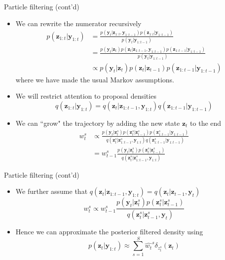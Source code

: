 \documentclass[10pt,mathserif]{beamer}
\begin{document}
\begin{frame}{Particle filtering (cont'd)}
\begin{itemize}
    \item We can rewrite the numerator recursively
    \begin{equation*} 
        \begin{split}
            p(\bm{z}_{1:t}|\bm{y}_{1:t})
            & = \frac{p(\bm{y}_t|\bm{z}_{1:t}, \bm{y}_{1:t-1})p(\bm{z}_{1:t}|\bm{y}_{1:t-1})}{p(\bm{y}_t|\bm{y}_{1:t-1})}\\
            & = \frac{p(\bm{y}_t|\bm{z}_t)p(\bm{z}_t|\bm{z}_{1:t-1}, \bm{y}_{1:t-1})p(\bm{z}_{1:t-1}|\bm{y}_{1:t-1})}{p(\bm{y}_t|\bm{y}_{1:t-1})} \\
            & \propto p(\bm{y}_t|\bm{z}_t)p(\bm{z}_t|\bm{z}_{t-1})p(\bm{z}_{1:t-1}|\bm{y}_{1:t-1})
        \end{split}
    \end{equation*} 
    where we have made the usual Markov assumptions. 
    \item We will restrict attention to proposal densities
    \begin{equation*} 
        q(\bm{z}_{1:t}|\bm{y}_{1:t}) = q(\bm{z}_t|\bm{z}_{1:t-1}, \bm{y}_{1:t})q(\bm{z}_{1:t-1}|\bm{y}_{1:t-1})
    \end{equation*} 
    \item We can ``grow" the trajectory by adding the new state $\bm{z}_t$ to the end
    \begin{equation*} 
        \begin{split}
            w_t^s 
            & \propto \frac{p(\bm{y}_t|\bm{z}_t^s )p(\bm{z}_t^s |\bm{z}_{t-1}^s)p(\bm{z}_{1:t-1}^s|\bm{y}_{1:t-1})}{q(\bm{z}_t^s|\bm{z}_{1:t-1}^s, \bm{y}_{1:t})q(\bm{z}_{1:t-1}^s|\bm{y}_{1:t-1}) }\\
            & = w_{t-1}^s\frac{p(\bm{y}_t|\bm{z}_t^s)p(\bm{z}_t^s |\bm{z}_{t-1}^s)}{q(\bm{z}_t^s |\bm{z}_{1:t-1}^s, \bm{y}_{1:t})}
        \end{split}    
    \end{equation*} 
\end{itemize}    
\end{frame}

\begin{frame}{Particle filtering (cont'd)}
\begin{itemize}
    \item We further assume that $q(\bm{z}_t|\bm{z}_{1:t-1}, \bm{y}_{1:t}) = q(\bm{z}_t|\bm{z}_{t-1},\bm{y}_t)$
    \begin{equation*} 
        w_t^s \propto w_{t-1}^s\frac{p(\bm{y}_t|\bm{z}_t^s)p(\bm{z}_t^s |\bm{z}_{t-1}^s)}{q(\bm{z}_t^s |\bm{z}_{t-1}^s, \bm{y}_{t})}
    \end{equation*} 
    \item Hence we can approximate the posterior filtered density using
        \begin{equation*} 
            p(\bm{z}_{t}|\bm{y}_{1:t}) \approx \sum_{s=1}^S{\hat{w_t}}^s\delta_{z^s_{t}}(\bm{z}_{t})
        \end{equation*}  
\end{itemize}  
\end{frame}
\end{document}
